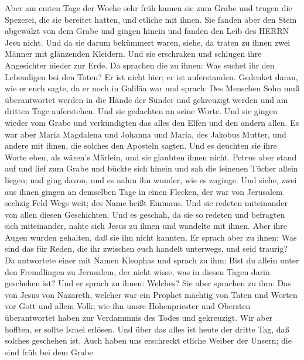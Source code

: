  Aber am ersten Tage der Woche sehr früh kamen sie zum Grabe
und trugen die Spezerei, die sie bereitet hatten, und etliche mit ihnen.
 Sie fanden aber den Stein abgewälzt von dem Grabe
 und gingen hinein und fanden den Leib des HERRN Jesu nicht.
 Und da sie darum bekümmert waren, siehe, da traten zu ihnen
zwei Männer mit glänzenden Kleidern.  Und sie erschraken und
schlugen ihre Angesichter nieder zur Erde. Da sprachen die zu ihnen: Was
suchet ihr den Lebendigen bei den Toten?  Er ist nicht hier;
er ist auferstanden. Gedenket daran, wie er euch sagte, da er noch in
Galiläa war  und sprach: Des Menschen Sohn muß überantwortet
werden in die Hände der Sünder und gekreuzigt werden und am dritten Tage
auferstehen.  Und sie gedachten an seine Worte. 
Und sie gingen wieder vom Grabe und verkündigten das alles den Elfen und
den andern allen.  Es war aber Maria Magdalena und Johanna
und Maria, des Jakobus Mutter, und andere mit ihnen, die solches den
Aposteln sagten.  Und es deuchten sie ihre Worte eben, als
wären's Märlein, und sie glaubten ihnen nicht.  Petrus aber
stand auf und lief zum Grabe und bückte sich hinein und sah die leinenen
Tücher allein liegen; und ging davon, und es nahm ihn wunder, wie es
zuginge.  Und siehe, zwei aus ihnen gingen an demselben
Tage in einen Flecken, der war von Jerusalem sechzig Feld Wegs weit; des
Name heißt Emmaus.  Und sie redeten miteinander von allen
diesen Geschichten.  Und es geschah, da sie so redeten und
befragten sich miteinander, nahte sich Jesus zu ihnen und wandelte mit
ihnen.  Aber ihre Augen wurden gehalten, daß sie ihn nicht
kannten.  Er sprach aber zu ihnen: Was sind das für Reden,
die ihr zwischen euch handelt unterwegs, und seid traurig? 
Da antwortete einer mit Namen Kleophas und sprach zu ihm: Bist du allein
unter den Fremdlingen zu Jerusalem, der nicht wisse, was in diesen Tagen
darin geschehen ist?  Und er sprach zu ihnen: Welches? Sie
aber sprachen zu ihm: Das von Jesus von Nazareth, welcher war ein
Prophet mächtig von Taten und Worten vor Gott und allem Volk;
 wie ihn unsre Hohenpriester und Obersten überantwortet
haben zur Verdammnis des Todes und gekreuzigt.  Wir aber
hofften, er sollte Israel erlösen. Und über das alles ist heute der
dritte Tag, daß solches geschehen ist.  Auch haben uns
erschreckt etliche Weiber der Unsern; die sind früh bei dem Grabe
